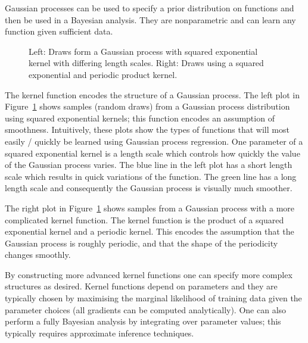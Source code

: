 \documentclass[final,authoryear,1p,times]{elsarticle}
\begin{document}
Gaussian processes can be used to specify a prior distribution on functions and then be used in a Bayesian analysis.
They are nonparametric and can learn any function given sufficient data.

\begin{figure}[ht]
  \begin{center}
    
  \end{center}
  \caption{Left: Draws form a Gaussian process with squared exponential kernel with differing length scales. Right: Draws using a squared exponential and periodic product kernel.}
  \label{fig:gp_samples}
\end{figure}

The kernel function encodes the structure of a Gaussian process.
The left plot in Figure~\ref{fig:gp_samples} shows samples (random draws) from a Gaussian process distribution using squared exponential kernels; this function encodes an assumption of smoothness.
Intuitively, these plots show the types of functions that will most easily / quickly be learned using Gaussian process regression.
One parameter of a squared exponential kernel is a length scale which controls how quickly the value of the Gaussian process varies.
The blue line in the left plot has a short length scale which results in quick variations of the function.
The green line has a long length scale and consequently the Gaussian process is visually much smoother.

The right plot in Figure~\ref{fig:gp_samples} shows samples from a Gaussian process with a more complicated kernel function.
The kernel function is the product of a squared exponential kernel and a periodic kernel.
This encodes the assumption that the Gaussian process is roughly periodic, and that the shape of the periodicity changes smoothly.

By constructing more advanced kernel functions one can specify more complex structures as desired.
Kernel functions depend on parameters and they are typically chosen by maximising the marginal likelihood of training data given the parameter choices (all gradients can be computed analytically).
One can also perform a fully Bayesian analysis by integrating over parameter values; this typically requires approximate inference techniques.




\end{document}
